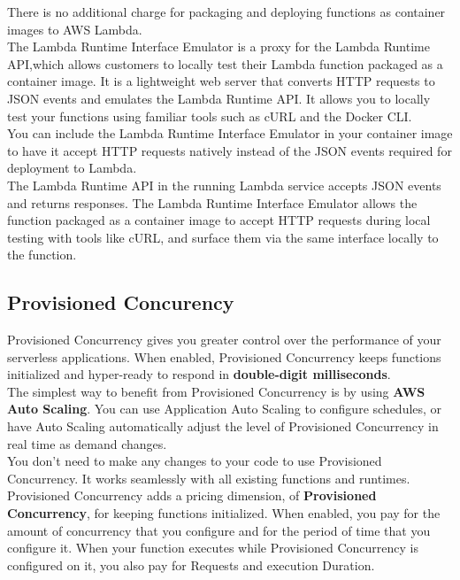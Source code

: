 \documentclass[12pt, letterpaper, twoside]{article}
\begin{document}
There is no additional charge for packaging and deploying functions as container images to AWS Lambda.\\

The Lambda Runtime Interface Emulator is a proxy for the Lambda Runtime API,which allows customers to locally test their Lambda function 
packaged as a container image. It is a lightweight web server that converts HTTP requests to JSON events and emulates the Lambda Runtime 
API. It allows you to locally test your functions using familiar tools such as cURL and the Docker CLI.\\
You can include the Lambda Runtime Interface Emulator in your container image to have it accept HTTP requests natively instead of the 
JSON events required for deployment to Lambda.\\

The Lambda Runtime API in the running Lambda service accepts JSON events and returns responses. The Lambda Runtime Interface Emulator 
allows the function packaged as a container image to accept HTTP requests during local testing with tools like cURL, and surface them 
via the same interface locally to the function.

\subsection{Provisioned Concurency}
Provisioned Concurrency gives you greater control over the performance of your serverless applications. When enabled, Provisioned 
Concurrency keeps functions initialized and hyper-ready to respond in \textbf{double-digit milliseconds}.\\

The simplest way to benefit from Provisioned Concurrency is by using \textbf{AWS Auto Scaling}. You can use Application Auto Scaling 
to configure schedules, or have Auto Scaling automatically adjust the level of Provisioned Concurrency in real time as demand changes.\\

You don’t need to make any changes to your code to use Provisioned Concurrency. It works seamlessly with all existing functions and 
runtimes.\\

Provisioned Concurrency adds a pricing dimension, of \textbf{Provisioned Concurrency}, for keeping functions initialized. When enabled,
you pay for the amount of concurrency that you configure and for the period of time that you configure it. When your function executes 
while Provisioned Concurrency is configured on it, you also pay for Requests and execution Duration.\\
\end{document}
